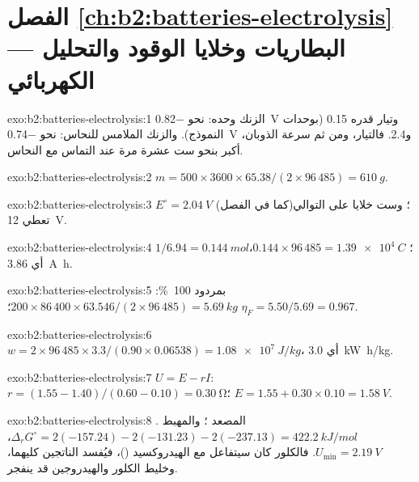 \section*{الفصل \ref{ch:b2:batteries-electrolysis} --- البطاريات وخلايا الوقود والتحليل الكهربائي}

\begin{solution}{exo:b2:batteries-electrolysis:1}
الزنك وحده: نحو \qty{-0.82}{V} وتيار قدره 0.15 (بوحدات النموذج). والزنك الملامس
للنحاس: نحو \qty{-0.74}{V} و2.4. فالتيار، ومن ثم سرعة الذوبان،
أكبر بنحو ست عشرة مرة عند التماس مع النحاس.
\end{solution}

\begin{solution}{exo:b2:batteries-electrolysis:2}
$m = 500 \times 3600 \times 65.38/(2 \times 96\,485) = \qty{610}{g}$.
\end{solution}

\begin{solution}{exo:b2:batteries-electrolysis:3}
$E^\circ = \qty{2.04}{V}$ (كما في الفصل)؛ وست خلايا على التوالي تعطي
\qty{12}{V}.
\end{solution}

\begin{solution}{exo:b2:batteries-electrolysis:4}
$1/6.94 = \qty{0.144}{mol}$؛ $0.144 \times 96\,485 = \qty{1.39e4}{C}$، أي
\qty{3.86}{A.h}.
\end{solution}

\begin{solution}{exo:b2:batteries-electrolysis:5}
بمردود 100~\%: $200 \times 86\,400 \times 63.546/(2 \times 96\,485) = \qty{5.69}{kg}$؛
$\eta_F = 5.50/5.69 = 0.967$.
\end{solution}

\begin{solution}{exo:b2:batteries-electrolysis:6}
$w = 2 \times 96\,485 \times 3.3/(0.90 \times 0.06538) = \qty{1.08e7}{J/kg}$، أي
\qty{3.0}{kW.h/kg}.
\end{solution}

\begin{solution}{exo:b2:batteries-electrolysis:7}
$U = E - rI$: $r = (1.55 - 1.40)/(0.60 - 0.10) = \qty{0.30}{\ohm}$؛ $E = 1.55 + 0.30
\times 0.10 = \qty{1.58}{V}$.
\end{solution}

\begin{solution}{exo:b2:batteries-electrolysis:8}
المصعد ؛ والمهبط . $\Delta_r G^\circ =
2(-157.24) - 2(-131.23) - 2(-237.13) = \qty{422.2}{kJ/mol}$، $U_{\min} =
\qty{2.19}{V}$. فالكلور كان سيتفاعل مع الهيدروكسيد ()، فيُفسد الناتجين كليهما، وخليط الكلور والهيدروجين
قد ينفجر.
\end{solution}


